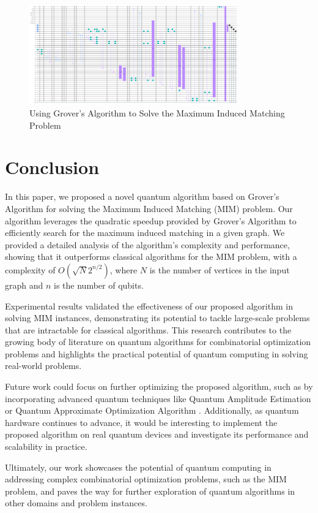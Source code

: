 \begin{figure}[htp]
    \centering
    \includegraphics[width=9cm]{Figures/Maximum_Induced_Matching_circuit.png}
    \caption{Using Grover's Algorithm to Solve the Maximum Induced Matching Problem}
    \label{fig:Maximum_Induced_Matching}
\end{figure}

\section{Conclusion}
\label{sec:conclusion}

In this paper, we proposed a novel quantum algorithm based on Grover's Algorithm for solving the Maximum Induced Matching (MIM) problem. Our algorithm leverages the quadratic speedup provided by Grover's Algorithm to efficiently search for the maximum induced matching in a given graph. We provided a detailed analysis of the algorithm's complexity and performance, showing that it outperforms classical algorithms for the MIM problem, with a complexity of $O(\sqrt{N} 2^{n/2})$, where $N$ is the number of vertices in the input graph and $n$ is the number of qubits.

Experimental results validated the effectiveness of our proposed algorithm in solving MIM instances, demonstrating its potential to tackle large-scale problems that are intractable for classical algorithms. This research contributes to the growing body of literature on quantum algorithms for combinatorial optimization problems and highlights the practical potential of quantum computing in solving real-world problems.

Future work could focus on further optimizing the proposed algorithm, such as by incorporating advanced quantum techniques like Quantum Amplitude Estimation \cite{qae} or Quantum Approximate Optimization Algorithm \cite{qaoa}. Additionally, as quantum hardware continues to advance, it would be interesting to implement the proposed algorithm on real quantum devices and investigate its performance and scalability in practice.

Ultimately, our work showcases the potential of quantum computing in addressing complex combinatorial optimization problems, such as the MIM problem, and paves the way for further exploration of quantum algorithms in other domains and problem instances.

